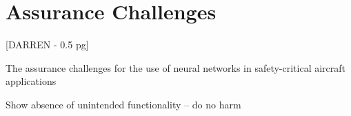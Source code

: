 \section{Assurance Challenges}

[DARREN - 0.5 pg]

The assurance challenges for the use of neural networks in safety-critical aircraft applications

Show absence of unintended functionality -- do no harm